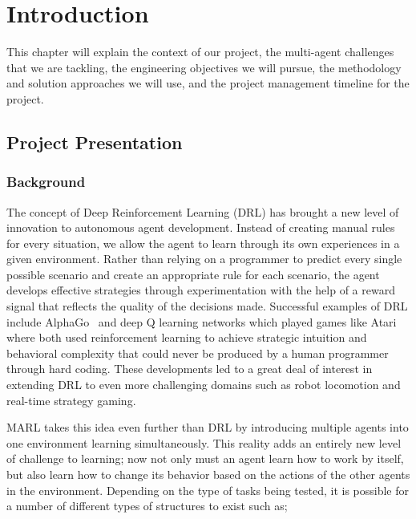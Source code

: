 \chapter{Introduction}
\label{ch:into}

This chapter will explain the context of our project, the multi-agent challenges that we are tackling,
the engineering objectives we will pursue, the methodology and solution approaches we will use,
and the project management timeline for the project.

\section{Project Presentation}
\label{sec:proj_pres}

\subsection{Background}
\label{sec:into_back}

The concept of Deep Reinforcement Learning (DRL) has brought a new level of innovation to 
autonomous agent development. Instead of creating manual rules for every situation, we allow 
the agent to learn through its own experiences in a given environment. Rather than relying 
on a programmer to predict every single possible scenario and create an appropriate rule for 
each scenario, the agent develops effective strategies through experimentation with the help 
of a reward signal that reflects the quality of the decisions made. Successful examples of 
DRL include AlphaGo~\citep{silver2016mastering} and deep Q learning networks which played 
games like Atari~\citep{mnih2015humanlevel} where both used reinforcement learning to achieve 
strategic intuition and behavioral complexity that could never be produced by a human programmer 
through hard coding. These developments led to a great deal of interest in extending DRL to 
even more challenging domains such as robot locomotion and real-time strategy gaming.

MARL takes this idea even further than DRL by introducing multiple agents into one environment 
learning simultaneously. This reality adds an entirely new level of challenge to learning; 
now not only must an agent learn how to work by itself, but also learn how to change its 
behavior based on the actions of the other agents in the environment. Depending on the type 
of tasks being tested, it is possible for a number of different types of structures to exist 
such as;

